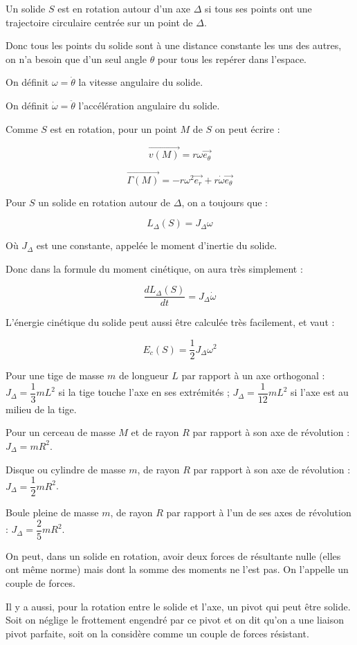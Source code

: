 \documentclass[a4paper,12pt]{book}
\newcommand{\Def}[2]{\begin{tcolorbox}[colback=white,colframe=red!10!green!20!blue!75!, title=Définition : #1]#2\end{tcolorbox}}
\newcommand{\Thr}[2]{\begin{tcolorbox}[sharp corners, colback=white,colframe=red!10!blue!30!green!75!, title=Théorème : #1]#2\end{tcolorbox}}
\begin{document}
\Def{Rotation}{Un solide $S$ est en rotation autour d'un axe $\Delta$ si tous ses points ont une trajectoire circulaire centrée sur un point de $\Delta$.
\par Donc tous les points du solide sont à une distance constante les uns des autres, on n'a besoin que d'un seul angle $\theta$ pour tous les repérer dans l'espace.
\par On définit $\omega = \dot{\theta}$ la vitesse angulaire du solide.
\par On définit $\dot{\omega}=\ddot{\theta}$ l'accélération angulaire du solide.
\par Comme $S$ est en rotation, pour un point $M$ de $S$ on peut écrire :
\par $$\vec{v(M)} = r\omega \vec{e_\theta}$$
\par $$\vec{\Gamma(M)} = -r\omega^2\vec{e_r} + r\dot{\omega}\vec{e_\theta}$$}
\Def{Moment d'inertie}{Pour $S$ un solide en rotation autour de $\Delta$, on a toujours que :
\par $$L_\Delta(S) = J_\Delta\omega$$
\par Où $J_\Delta$ est une constante, appelée le moment d'inertie du solide.
\par Donc dans la formule du moment cinétique, on aura très simplement :
\par $$\dfrac{dL_\Delta(S)}{dt}=J_\Delta\dot{\omega}$$
\par L'énergie cinétique du solide peut aussi être calculée très facilement, et vaut :
\par $$ E_c(S) = \frac{1}{2}J_\Delta\omega^2$$}
\Thr{Exemples de moments d'inertie}{Pour une tige de masse $m$ de longueur $L$ par rapport à un axe orthogonal : $J_\Delta = \dfrac{1}{3}mL^2$ si la tige touche l'axe en ses extrémités ; $J_\Delta = \dfrac{1}{12}mL^2$ si l'axe est au milieu de la tige.
\par Pour un cerceau de masse $M$ et de rayon $R$ par rapport à son axe de révolution : $J_\Delta=mR^2$.
\par Disque ou cylindre de masse $m$, de rayon $R$ par rapport à son axe de révolution : $J_\Delta = \dfrac{1}{2}mR^2$.
\par Boule pleine de masse $m$, de rayon $R$ par rapport à l'un de ses axes de révolution : $J_\Delta = \dfrac{2}{5}mR^2$.}
\Def{Forces à considérer}{On peut, dans un solide en rotation, avoir deux forces de résultante nulle (elles ont même norme) mais dont la somme des moments ne l'est pas. On l'appelle un couple de forces.
\par Il y a aussi, pour la rotation entre le solide et l'axe, un pivot qui peut être solide. Soit on néglige le frottement engendré par ce pivot et on dit qu'on a une liaison pivot parfaite, soit on la considère comme un couple de forces résistant.}
\end{document}
